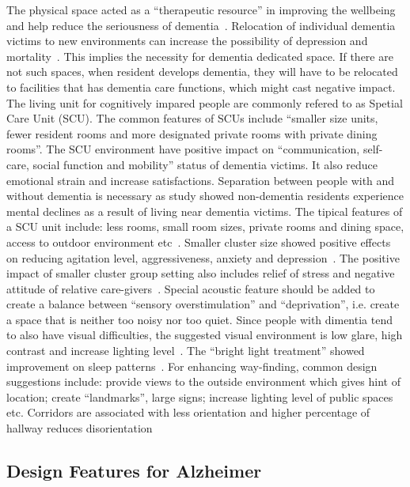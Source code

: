 The physical space acted as a ``therapeutic resource'' in improving
the wellbeing and help reduce the seriousness of
dementia~\cite{Day2000}. Relocation of individual dementia victims to
new environments can increase the possibility of depression and
mortality~\cite{ANTHONY01111987}. This implies the necessity for
dementia dedicated space. If there are not such spaces, when resident
develops dementia, they will have to be relocated to facilities that
has dementia care functions, which might cast negative impact. The
living unit for cognitively impared people are commonly refered to as
Spetial Care Unit (SCU). The common features of SCUs include ``smaller
size units, fewer resident rooms and more designated private rooms
with private dining rooms''. The SCU environment have positive impact
on ``communication, self-care, social function and mobility'' status
of dementia victims. It also reduce emotional strain and increase
satisfactions. Separation between people with and without dementia is
necessary as study showed non-dementia residents experience mental
declines as a result of living near dementia victims. The tipical
features of a SCU unit include: less rooms, small room sizes, private
rooms and dining space, access to outdoor environment
etc~\cite{Day2000}. Smaller cluster size showed positive effects on
reducing agitation level, aggressiveness, anxiety and
depression~\cite{Day2000}. The positive impact of smaller cluster
group setting also includes relief of stress and negative attitude of
relative care-givers~\cite{Annerstedt19931529, Day2000}. Special
acoustic feature should be added to create a balance between ``sensory
overstimulation'' and ``deprivation'', i.e. create a space that is
neither too noisy nor too quiet. Since people with dimentia tend to
also have visual difficulties, the suggested visual environment is low
glare, high contrast and increase lighting level~\cite{Day2000}. The
``bright light treatment'' showed improvement on sleep
patterns~\cite{Mishima1994}. For enhancing way-finding, common design
suggestions include: provide views to the outside environment which
gives hint of location; create ``landmarks'', large signs; increase
lighting level of public spaces etc. Corridors are associated with
less orientation and higher percentage of hallway reduces
disorientation~\cite{Day2000}
\subsection{Design Features for Alzheimer}

